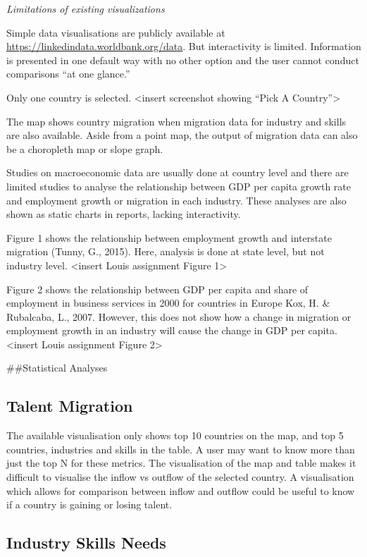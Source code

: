 \documentclass{acm_proc_article-sp}
\begin{document}
\emph{Limitations of existing visualizations}

Simple data visualisations are publicly available at
\url{https://linkedindata.worldbank.org/data}. But interactivity is
limited. Information is presented in one default way with no other
option and the user cannot conduct comparisons ``at one glance.''

Only one country is selected. \textless insert screenshot showing ``Pick
A Country''\textgreater{}

The map shows country migration when migration data for industry and
skills are also available. Aside from a point map, the output of
migration data can also be a choropleth map or slope graph.

Studies on macroeconomic data are usually done at country level and
there are limited studies to analyse the relationship between GDP per
capita growth rate and employment growth or migration in each industry.
These analyses are also shown as static charts in reports, lacking
interactivity.

Figure 1 shows the relationship between employment growth and interstate
migration (Tunny, G., 2015). Here, analysis is done at state level, but
not industry level. \textless insert Louis assignment Figure
1\textgreater{}

Figure 2 shows the relationship between GDP per capita and share of
employment in business services in 2000 for countries in Europe Kox, H.
\& Rubalcaba, L., 2007. However, this does not show how a change in
migration or employment growth in an industry will cause the change in
GDP per capita. \textless insert Louis assignment Figure 2\textgreater{}

\#\#Statistical Analyses

\hypertarget{talent-migration}{%
\subsection{Talent Migration}\label{talent-migration}}

The available visualisation only shows top 10 countries on the map, and
top 5 countries, industries and skills in the table. A user may want to
know more than just the top N for these metrics. The visualisation of
the map and table makes it difficult to visualise the inflow vs outflow
of the selected country. A visualisation which allows for comparison
between inflow and outflow could be useful to know if a country is
gaining or losing talent.

\hypertarget{industry-skills-needs}{%
\subsection{Industry Skills Needs}\label{industry-skills-needs}}
\end{document}
